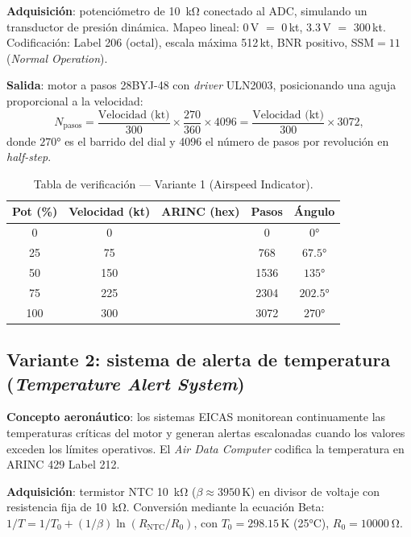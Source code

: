 \documentclass[11pt]{article}
\begin{document}
\textbf{Adquisición}: potenciómetro de \SI{10}{\kilo\ohm} conectado al ADC, simulando un
transductor de presión dinámica. Mapeo lineal: 0\,V $=$ 0\,kt, 3.3\,V $=$ 300\,kt.
Codificación: Label 206 (octal), escala máxima 512\,kt, BNR positivo, SSM$=11$ (\emph{Normal
Operation}).

\textbf{Salida}: motor a pasos 28BYJ-48 con \emph{driver} ULN2003, posicionando una aguja
proporcional a la velocidad:
\begin{equation}
  N_\text{pasos} = \frac{\text{Velocidad (kt)}}{300}\times\frac{270}{360}\times 4096 =
  \frac{\text{Velocidad (kt)}}{300}\times 3072,
\end{equation}
donde $270\si{\degree}$ es el barrido del dial y 4096 el número de pasos por revolución
en \emph{half-step}.

\begin{table}[H]\centering
\caption{Tabla de verificación — Variante 1 (Airspeed Indicator).}
\begin{tabular}{ccccc}
\toprule
Pot (\%) & Velocidad (kt) & ARINC (hex) & Pasos & Ángulo \\
\midrule
0 & 0 & & 0 & $0\si{\degree}$ \\
25 & 75 & & 768 & $67.5\si{\degree}$ \\
50 & 150 & & 1536 & $135\si{\degree}$ \\
75 & 225 & & 2304 & $202.5\si{\degree}$ \\
100 & 300 & & 3072 & $270\si{\degree}$ \\
\bottomrule
\end{tabular}
\end{table}

\subsection{Variante 2: sistema de alerta de temperatura (\emph{Temperature Alert System})}
\textbf{Concepto aeronáutico}: los sistemas EICAS monitorean continuamente las
temperaturas críticas del motor y generan alertas escalonadas cuando los valores exceden
los límites operativos. El \emph{Air Data Computer} codifica la temperatura en ARINC 429
Label 212.

\textbf{Adquisición}: termistor NTC \SI{10}{\kilo\ohm} ($\beta\approx3950$\,K) en divisor
de voltaje con resistencia fija de \SI{10}{\kilo\ohm}. Conversión mediante la ecuación
Beta: $1/T=1/T_0+(1/\beta)\ln(R_\text{NTC}/R_0)$, con $T_0=298.15$\,K (25\si{\celsius}),
$R_0=\SI{10000}{\ohm}$.
\end{document}

